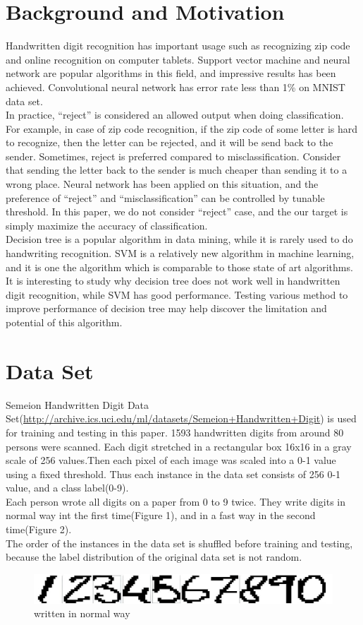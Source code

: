 \documentclass[a4paper,11pt]{article}
\begin{document}
\section{Background and Motivation}
Handwritten digit recognition has important usage such as recognizing zip code and online recognition on computer tablets. Support vector machine and neural network are popular algorithms in this field, and impressive results has been achieved. Convolutional neural network has error rate less than 1\% on MNIST data set\cite{lecun98}. \\
In practice, ``reject'' is considered an allowed output when doing classification. For example, in case of zip code recognition, if the zip code of some letter is hard to recognize, then the letter can be rejected, and it will be send back to the sender. Sometimes, reject is preferred compared to misclassification. Consider that sending the letter back to the sender is much cheaper than sending it to a wrong place. Neural network has been applied on this situation, and the preference of ``reject'' and ``misclassification'' can be controlled by tunable threshold\cite{slg92}. In this paper, we do not consider ``reject'' case, and the our target is simply maximize the accuracy of classification.\\
Decision tree is a popular algorithm in data mining, while it is rarely used to do handwriting recognition. SVM is a relatively new algorithm in machine learning, and it is one the algorithm which is comparable to those state of art algorithms\cite{lecun98}.\\
It is interesting to study why decision tree does not work well in handwritten digit recognition, while SVM has good performance. Testing various method to improve performance of decision tree may help discover the limitation and potential of this algorithm.
\section{Data Set}
Semeion Handwritten Digit Data Set(\url{http://archive.ics.uci.edu/ml/datasets/Semeion+Handwritten+Digit}) is used for training and testing in this paper. 1593 handwritten digits from around 80 persons were scanned. Each digit stretched in a rectangular box 16x16 in a gray scale of 256 values.Then each pixel of each image was scaled into a 0-1 value using a fixed threshold. Thus each instance in the data set consists of 256 0-1 value, and a class label(0-9).\\
Each person wrote all digits on a paper from 0 to 9 twice. They write digits in normal way int the first time(Figure 1), and in a fast way in the second time(Figure 2).\\
The order of the instances in the data set is shuffled before training and testing, because the label distribution of the original data set is not random.
\begin{figure}
\centering
\includegraphics[width=1.0\textwidth]{clear}
\caption{written in normal way}
\end{figure}
\end{document}

